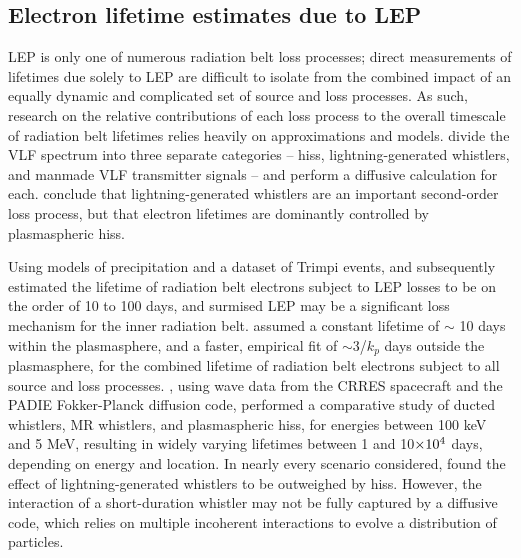 \subsection{Electron lifetime estimates due to LEP}
LEP is only one of numerous radiation belt loss processes; direct measurements of lifetimes due solely to LEP are difficult to isolate from the combined impact of an equally dynamic and complicated set of source and loss processes. As such, research on the relative contributions of each loss process to the overall timescale of radiation belt lifetimes relies heavily on approximations and models. \cite{Abel1998} divide the VLF spectrum into three separate categories -- hiss, lightning-generated whistlers, and manmade VLF transmitter signals -- and perform a diffusive calculation for each. \citeauthor{Abel1998} conclude that lightning-generated whistlers are an important second-order loss process, but that electron lifetimes are dominantly controlled by plasmaspheric hiss.

Using models of precipitation and a dataset of Trimpi events, \cite{Rodger2003} and subsequently \cite{Rodger2010} estimated the lifetime of radiation belt electrons subject to LEP losses to be on the order of 10 to 100 days, and surmised LEP may be a significant loss mechanism for the inner radiation belt. \cite{Shprits2005} assumed a constant lifetime of $\sim$ 10 days within the plasmasphere, and a faster, empirical fit of $\sim 3$/$k_p$ days outside the plasmasphere, for the combined lifetime of radiation belt electrons subject to all source and loss processes. \cite{Meredith2007}, using wave data from the CRRES spacecraft and the PADIE Fokker-Planck diffusion code, performed a comparative study of ducted whistlers, MR whistlers, and plasmaspheric hiss, for energies between 100 keV and 5 MeV, resulting in widely varying lifetimes between 1 and 10$\times 10^{4}$ days, depending on energy and location. In nearly every scenario considered, \citeauthor{Meredith2007} found the effect of lightning-generated whistlers to be outweighed by hiss. However, the interaction of a short-duration whistler may not be fully captured by a diffusive code, which relies on multiple incoherent interactions to evolve a distribution of particles.




